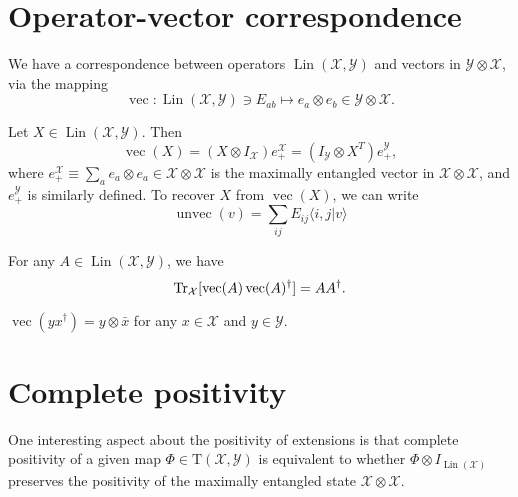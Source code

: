 \documentclass[12pt]{report}
\newcommand{\on}[1]{\operatorname{#1}}
\newcommand{\calY}{{\mathcal{Y}}}
\newcommand{\calX}{{\mathcal{X}}}
\newcommand{\rmT}{{\mathrm{T}}}
\DeclareMathOperator{\Lin}{Lin}
\begin{document}
\section{Operator-vector correspondence}

We have a correspondence between operators $\Lin(\calX,\calY)$ and vectors in $\calY\otimes\calX$, via the mapping
\begin{equation}
	\on{vec}:\Lin(\calX,\calY)\ni E_{ab} \mapsto e_a\otimes e_b\in\calY\otimes\calX.
\end{equation}

\begin{prop}
	Let $X\in\Lin(\calX,\calY)$. Then
	\begin{equation}
		\on{vec}(X) = (X\otimes I_{\calX}) e_+^\calX
		= (I_{\calY}\otimes X^T) e_+^\calY,
	\end{equation}
	where $e_+^\calX\equiv\sum_a e_a\otimes e_a\in\calX\otimes\calX$ is the maximally entangled vector in $\calX\otimes\calX$, and $e_+^\calY$ is similarly defined.
	To recover $X$ from $\on{vec}(X)$, we can write
	\begin{equation}
		\on{unvec}(v) = \sum_{ij} E_{ij} \langle i,j|v\rangle
	\end{equation}
\end{prop}

\begin{prop}
	For any $A\in\Lin(\calX,\calY)$, we have
	\begin{equation}
		\Tr_\calX[\on{vec}(A)\on{vec}(A)^\dagger] = AA^\dagger.
	\end{equation}
\end{prop}

\begin{example}
	$\on{vec}(yx^\dagger) = y\otimes \bar x$ for any $x\in\calX$ and $y\in\calY$.
\end{example}

\section{Complete positivity}

One interesting aspect about the positivity of extensions is that complete positivity of a given map $\Phi\in\rmT(\calX,\calY)$ is equivalent to whether $\Phi\otimes I_{\Lin(\calX)}$ preserves the positivity of the maximally entangled state $\calX\otimes\calX$.
\end{document}
